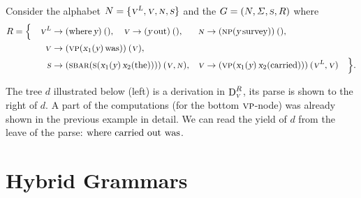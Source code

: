 \documentclass[../document.tex]{subfiles}
\begin{document}
    \begin{example}
        Consider the alphabet \(N = \{\textsc{\textsl{v}}^{\textsc{\textsl{L}}}, \textsc{\textsl{v}}, \textsc{\textsl{n}}, \textsc{\textsl{s}} \}\) and the  \(G = (N, \varSigma, \textsc{\textsl{s}}, R)\) where
        \begin{align*}
            R = \Big\{ \quad
            \textsc{\textsl{v}}^{\textsc{\textsl{L}}} &\to (\text{where} \, \textsl{y})\:(),
            \quad \textsc{\textsl{v}} \to (\textsl{y} \, \text{out})\:(),
            &\textsc{\textsl{n}} &\to (\textsc{np} (\textsl{y} \, \text{survey}))\:(), \\
            \textsc{\textsl{v}} &\to (\textsc{vp}(\textsl{x}_1(\textsl{y}) \, \text{was}))\:(\textsc{\textsl{v}}),  \\
            \textsc{\textsl{s}} &\to (\textsc{sbar} (\textsc{s} (\textsl{x}_1(\textsl{y}) \, \textsl{x}_2(\text{the}))))\:(\textsc{\textsl{v}}, \textsc{\textsl{n}}),
            &\textsc{\textsl{v}} &\to (\textsc{vp}(\textsl{x}_1(\textsl{y}) \, \textsl{x}_2(\text{carried})))\:(\textsc{\textsl{v}}^{\textsc{\textsl{L}}}, \textsc{\textsl{v}})
            \quad \Big\} \text{.}
        \end{align*}

        The tree \(d\) illustrated below (left) is a derivation in \(\operatorname{D}^R_{\textsc{\textsl{v}}}\), its parse is shown to the right of \(d\).
        A part of the computations (for the bottom \(\textsc{vp}\)-node) was already shown in the previous example in detail.
        We can read the yield of \(d\) from the leave of the parse: \(\text{where carried out was}\).

        \null\hfill
        \hfill
        \hfill\null
    \end{example}

    \section{Hybrid Grammars}

    \ifSubfilesClassLoaded{%
        \printindex
    }{}
\end{document}
